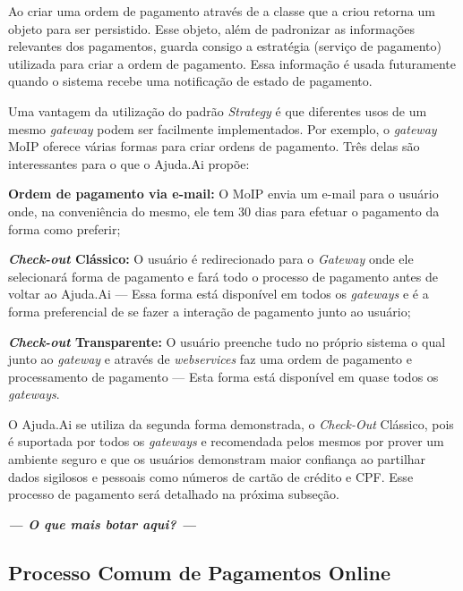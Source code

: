 Ao criar uma ordem de pagamento através de  a classe que a criou retorna um objeto  para ser persistido. Esse objeto, além de padronizar as informações relevantes dos pagamentos, guarda consigo a estratégia (serviço de pagamento) utilizada para criar a ordem de pagamento. Essa informação é usada futuramente quando o sistema recebe uma notificação de estado de pagamento.

Uma vantagem da utilização do padrão \emph{Strategy} é que diferentes usos de um mesmo \emph{gateway} podem ser facilmente implementados. Por exemplo, o \emph{gateway} MoIP oferece várias formas para criar ordens de pagamento. Três delas são interessantes para o que o Ajuda.Ai propõe:

\begin{lista}
  \item \textbf{Ordem de pagamento via e-mail:} O MoIP envia um e-mail para o usuário onde, na conveniência do mesmo, ele tem 30 dias para efetuar o pagamento da forma como preferir;
  \item \textbf{\emph{Check-out} Clássico:} O usuário é redirecionado para o \emph{Gateway} onde ele selecionará forma de pagamento e fará todo o processo de pagamento antes de voltar ao Ajuda.Ai --- Essa forma está disponível em todos os \emph{gateways} e é a forma preferencial de se fazer a interação de pagamento junto ao usuário;
  \item \textbf{\emph{Check-out} Transparente:} O usuário preenche tudo no próprio sistema o qual junto ao \emph{gateway} e através de \emph{webservices} faz uma ordem de pagamento e processamento de pagamento --- Esta forma está disponível em quase todos os \emph{gateways}.
\end{lista}

O Ajuda.Ai se utiliza da segunda forma demonstrada, o \emph{Check-Out} Clássico, pois é suportada por todos os \emph{gateways} e recomendada pelos mesmos por prover um ambiente seguro e que os usuários demonstram maior confiança ao partilhar dados sigilosos e pessoais como números de cartão de crédito e CPF. Esse processo de pagamento será detalhado na próxima subseção.

\textbf{\textit{--- O que mais botar aqui? ---}}





\subsection{Processo Comum de Pagamentos Online} \label{sec:ajudaai:processo_pagamento}

